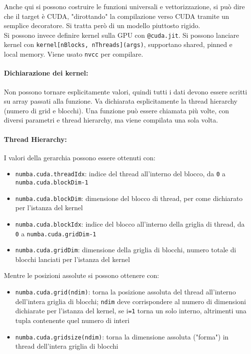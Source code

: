 Anche qui si possono costruire le funzioni universali e vettorizzazione, si può dire che il target è CUDA, "dirottando" la compilazione verso CUDA tramite un semplice decoratore. Si tratta però di un modello piuttosto rigido.\\

Si possono invece definire kernel sulla GPU con \texttt{@cuda.jit}. Si possono lanciare kernel con \texttt{kernel[nBlocks, nThreads](args)}, supportano shared, pinned e local memory. Viene usato \texttt{nvcc} per compilare.\\

\paragraph{Dichiarazione dei kernel:} Non possono tornare esplicitamente valori, quindi tutti i dati devono essere scritti su array passati alla funzione. Va dichiarata esplicitamente la thread hierarchy (numero di grid e blocchi). Una funzione può essere chiamata più volte, con diversi parametri e thread hierarchy, ma viene compilata una sola volta.\\

\paragraph{Thread Hierarchy:} I valori della gerarchia possono essere ottenuti con: 
\begin{itemize}
	\item \texttt{numba.cuda.threadIdx}: indice del thread all'interno del blocco, da \texttt{0} a \texttt{numba.cuda.blockDim-1}
	\item \texttt{numba.cuda.blockDim}: dimensione del blocco di thread, per come dichiarato per l'istanza del kernel 
	\item \texttt{numba.cuda.blockIdx}: indice del blocco all'interno della griglia di thread, da \texttt{0} a \texttt{numba.cuda.gridDim-1}
	\item \texttt{numba.cuda.gridDim}: dimensione della griglia di blocchi, numero totale di blocchi lanciati per l'istanza del kernel
\end{itemize}
Mentre le posizioni assolute si possono ottenere con: 
\begin{itemize}
	\item \texttt{numba.cuda.grid(ndim)}: torna la posizione assoluta del thread all'interno dell'intera griglia di blocchi; \texttt{ndim} deve corrispondere al numero di dimensioni dichiarate per l'istanza del kernel, se i\texttt{=1} torna un solo interno, altrimenti una tupla contenente quel numero di interi
	\item \texttt{numba.cuda.gridsize(ndim)}: torna la dimensione assoluta ("forma") in thread dell'intera griglia di blocchi
\end{itemize}

